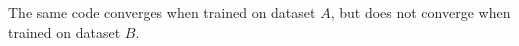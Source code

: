 \begin{answer}
  The same code converges when trained on dataset $A$, but does not converge when trained on dataset $B$.
\end{answer}
